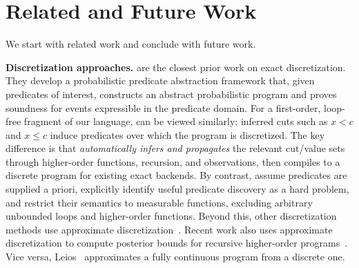 \section{Related and Future Work}
\label{sec:related}
We start with related work and conclude with future work.

\smallskip
\noindent\textbf{Discretization approaches.}
\citet{Holtzen2018Abstraction} are the closest prior work on exact discretization. They develop a probabilistic predicate abstraction framework that, given predicates of interest, constructs an abstract probabilistic program and proves soundness for events expressible in the predicate domain. For a first-order, loop-free fragment of our language, \Slice{} can be viewed similarly: inferred cuts such as $x<c$ and $x\le c$ induce predicates over which the program is discretized. The key difference is that \Slice{} \emph{automatically infers and propagates} the relevant cut/value sets through higher-order functions, recursion, and observations, then compiles to a discrete program for existing exact backends. By contrast, \citet{Holtzen2018Abstraction} assume predicates are supplied a priori, explicitly identify useful predicate discovery as a hard problem, and restrict their semantics to measurable functions, excluding arbitrary unbounded loops and higher-order functions. Beyond this, other discretization methods use approximate discretization~\cite{Huang2021AQUA,Garg2024BitBlast,Claret2013BayesianDataFlow}. Recent work also uses approximate discretization to compute posterior bounds for recursive higher-order programs~\cite{Beutner2022GuaranteedBounds}. Vice versa, Leios~\cite{Laurel2020ContinualizationCorrection} approximates a fully continuous program from a discrete one. %

